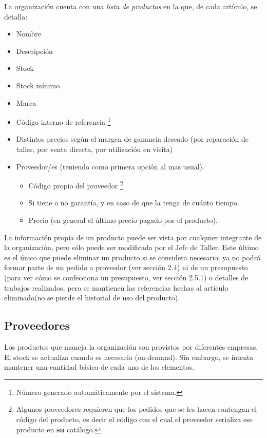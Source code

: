 \documentclass[12pt]{extarticle}
\begin{document}
\begin{spacing}{1.2}
    La organización cuenta con una \textit{lista de productos} en la que, de cada artículo, se detalla: 
    \begin{itemize}
        \item Nombre
        \item Descripción
    	\item Stock
    	\item Stock mínimo
        \item Marca
        \item Código interno de referencia \footnote{Número generado automáticamente por el sistema.}
        \item Distintos precios según el margen de ganancia deseado (por reparación de taller, por venta directa, por utilización en visita)
        \item Proveedor/es (teniendo como primera opción al mas usual). 
		\begin{itemize}
	        \item Código propio del proveedor \footnote{Algunos proveedores requieren que los pedidos que se les hacen contengan el código del producto, es decir el código con el cual el proveedor serializa ese producto en \textbf{su} catálogo.}
    	    \item Si tiene o no garantía, y en caso de que la tenga de cuánto tiempo.
    	    \item Precio (en general el último precio pagado por el producto).
		\end{itemize}
    \end{itemize}

    La información propia de un producto puede ser vista por cualquier integrante de la organización, pero sólo puede ser modificada por el Jefe de Taller. Este último es el único que puede eliminar un producto si se considera necesario; ya no podrá formar parte de un pedido a proveedor (ver sección 2.4) ni de un presupuesto (para ver cómo se confecciona un presupuesto, ver sección 2.5.1) o detalles de trabajos realizados, pero se mantienen las referencias hechas al artículo eliminado(no se pierde el historial de uso del producto).
    
    \subsection{Proveedores}
    Los productos que maneja la organización son provistos por diferentes empresas. El stock se actualiza cuando es necesario (on-demand). Sin embargo, se intenta mantener una cantidad básica de cada uno de los elementos.\\


\end{spacing}
\end{document}
